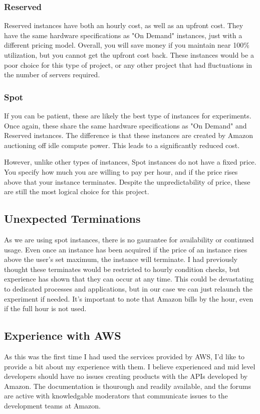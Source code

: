 \documentclass{article}
\begin{document}
\subsubsection{Reserved}
Reserved instances have both an hourly cost, as well as an upfront cost. They have the same hardware specifications as "On Demand" instances, just with a different pricing model. Overall, you will save money if you maintain near 100\% utilization, but you cannot get the upfront cost back. These instances would be a poor choice for this type of project, or any other project that had fluctuations in the number of servers required.
\subsubsection{Spot}
If you can be patient, these are likely the best type of instances for experiments. Once again, these share the same hardware specifications as "On Demand" and Reserved instances. The difference is that these instances are created by Amazon auctioning off idle compute power. This leads to a significantly reduced cost.

However, unlike other types of instances, Spot instances do not have a fixed price. You specify how much you are willing to pay per hour, and if the price rises above that your instance terminates. Despite the unpredictability of price, these are still the most logical choice for this project.
\subsection{Unexpected Terminations}
As we are using spot instances, there is no gaurantee for availability or continued usage. Even once an instance has been acquired if the price of an instance rises above the user's set maximum, the instance will terminate. I had previously thought these terminates would be restricted to hourly condition checks, but experience has shown that they can occur at any time. This could be devastating to dedicated processes and applications, but in our case we can just relaunch the experiment if needed. It's important to note that Amazon bills by the hour, even if the full hour is not used.
\subsection{Experience with AWS}
As this was the first time I had used the services provided by AWS, I'd like to provide a bit about my experience with them. I believe experienced and mid level developers should have no issues creating products with the APIs developed by Amazon. The documentation is thourough and readily available, and the forums are active with knowledgable moderators that communicate issues to the development teams at Amazon.
\end{document}

